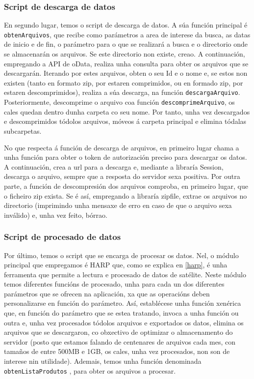 \subsubsection{Script de descarga de datos}\label{descarga}
En segundo lugar, temos o script de descarga de datos. A súa función principal é \texttt{obtenArquivos}, que recibe como parámetros a area de interese da busca, as datas de inicio e de fin, o parámetro
para o que se realizará a busca e o directorio onde se almacenarán os arquivos. Se este directorio non existe, creao. A continuación, empregando a API de oData, realiza unha consulta para obter os
arquivos que se descargarán. Iterando por estes arquivos, obten o seu Id e o nome e, se estos non existen (tanto en formato zip, por estaren comprimidos, ou en formado zip, por estaren
descomprimidos), realiza a súa descarga, na función \texttt{descargaArquivo}. Posteriormente, descomprime o arquivo coa función \texttt{descomprimeArquivo}, os cales quedan dentro dunha carpeta co seu
nome. Por tanto, unha vez descargados e descomprimidos tódolos arquivos, móveos á carpeta principal e elimina tódalas subcarpetas.

No que respecta á función de descarga de arquivos, en primeiro lugar chama a unha función para obter o token de autorización preciso para descargar os datos. A continuación, crea a url para a
descarga e, mediante a libraría Session, descarga o arquivo, sempre que a resposta do servidor sexa positiva. Por outra parte, a función de descompresión dos arquivos comproba, en primeiro lugar,
que o ficheiro zip exista. Se é así, empregando a libraría zipfile, extrae os arquivos no directorio (imprimindo unha mensaxe de erro en caso de que o arquivo sexa inválido) e, unha vez feito, bórrao.

\subsubsection{Script de procesado de datos}\label{procesado}
Por último, temos o script que se encarga de procesar os datos. Nel, o módulo principal que empregamos é HARP que, como se explica en \ref{harp}, é unha ferramenta que permite a
lectura e procesado de datos de satélite. Neste módulo temos diferentes funcións de procesado, unha para cada un dos diferentes parámetros que se ofrecen na aplicación, xa que as
operacións deben personalizarse en función do parámetro. Así, establécese unha función xenérica que, en función do parámetro que se estea tratando, invoca a unha función ou outra e,
unha vez procesados tódolos arquivos e exportados os datos, elimina os arquivos que se descargaron, co obxectivo de optimizar o almacenamento do servidor (posto que estamos falando de
centenares de arquivos cada mes, con tamaños de entre 500MB e 1GB, os cales, unha vez procesados, non son de interese nin utilidade). Ademais, temos unha función denominada \texttt{obtenListaProdutos}
, para obter os arquivos a procesar.

